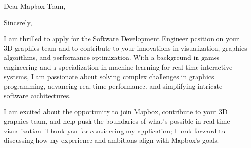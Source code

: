 \documentclass[12pt,a4paper]{moderncv}
\makeatletter
\newcommand*{\subject}[1]{\def\@subject{#1}}
\makeatother
\begin{document}
\date{Würzburg, \today}%
\subject{Application for Software Development Engineer II, 3d Graphics}
\opening{Dear Mapbox Team,}
    
\closing{Sincerely,}

\makelettertitle
I am thrilled to apply for the Software Development Engineer position on your 3D graphics team 
and to contribute to your innovations in visualization, graphics algorithms, and performance optimization. 
With a background in games engineering and a specialization in machine learning for real-time interactive systems, 
I am passionate about solving complex challenges in graphics programming, 
advancing real-time performance, and simplifying intricate software architectures.

 

 



I am excited about the opportunity to join Mapbox, 
contribute to your 3D graphics team, 
and help push the boundaries of what’s possible in real-time visualization. 
Thank you for considering my application; 
I look forward to discussing how my experience and ambitions align with Mapbox’s goals.

\vspace{0.5cm}


\makeletterclosing
\end{document}

